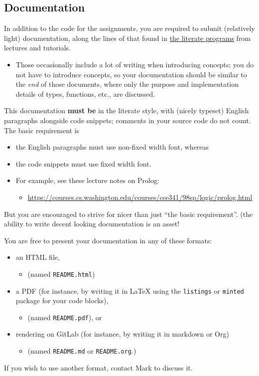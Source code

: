\documentclass[11pt]{article}
\begin{document}
\subsection*{Documentation}
\label{sec:orgc4344b4}
In addition to the code for the assignments,
you are required to submit (relatively light) documentation,
along the lines of that found in
\href{https://armkeh.github.io/principles-of-programming-languages/\#outline-container-Lecture-literate-programs}{the literate programs}
from lectures and tutorials.
\begin{itemize}
\item Those occasionally include a lot of writing when introducing concepts;
you do not have to introduce concepts, so your documentation
should be similar to the \emph{end} of those documents,
where only the purpose and implementation details
of types, functions, etc., are discussed.
\end{itemize}

This documentation \textbf{must be} in the literate style,
with (nicely typeset) English paragraphs alongside code snippets;
comments in your source code do not count.
The basic requirement is
\begin{itemize}
\item the English paragraphs must use non-fixed width font, whereas
\item the code snippets must use fixed width font.
\item For example, see these lecture notes on Prolog:
\begin{itemize}
\item \url{https://courses.cs.washington.edu/courses/cse341/98sp/logic/prolog.html}
\end{itemize}
\end{itemize}
But you are encouraged to strive for nicer than just
“the basic requirement”.
(the ability to write decent looking documentation is an asset!

You are free to present your documentation in any of these formats:
\begin{itemize}
\item an HTML file,
\begin{itemize}
\item (named \texttt{README.html})
\end{itemize}
\item a PDF (for instance, by writing it in \LaTeX{} using
the \texttt{listings} or \texttt{minted} package for your code blocks),
\begin{itemize}
\item (named \texttt{README.pdf}), or
\end{itemize}
\item rendering on GitLab (for instance, by writing it in markdown or Org)
\begin{itemize}
\item (named \texttt{README.md} or \texttt{README.org}.)
\end{itemize}
\end{itemize}
If you wish to use another format, contact Mark to discuss it.
\end{document}
